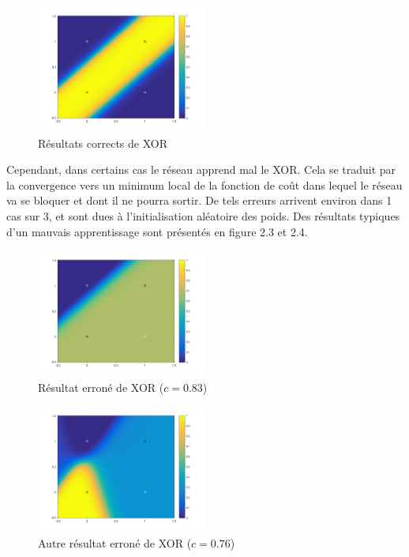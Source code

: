 \begin{figure}[!ht]
\begin{center}
  \includegraphics[width=0.5\textwidth]{images/xor1.png}
\end{center}
\caption{Résultats corrects de XOR}
\end{figure}

Cependant, dans certains cas le réseau apprend mal le XOR. Cela se traduit par la convergence vers un minimum local de la fonction de coût dans lequel le réseau va se bloquer et dont il ne pourra sortir. De tels erreurs arrivent environ dans 1 cas sur 3, et sont dues à l'initialisation aléatoire des poids. Des résultats typiques d'un mauvais apprentissage sont présentés en figure 2.3 et 2.4.

\begin{figure}[!ht]
\begin{center}
  \includegraphics[width=0.5\textwidth]{images/xor2.png}
\end{center}
\caption{Résultat erroné de XOR ($c = 0.83$)}
\end{figure}

\begin{figure}[!ht]
\begin{center}
  \includegraphics[width=0.5\textwidth]{images/xor3.png}
\end{center}
\caption{Autre résultat erroné de XOR ($c = 0.76$)}
\end{figure}

